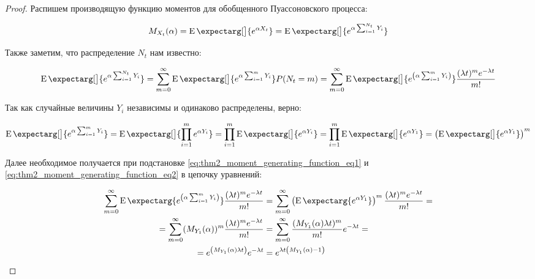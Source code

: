 \documentclass[a4paper,12pt]{article}
\theoremstyle{definition}
\newcommand{\expect}{\operatorname{E}\expectarg}
\begin{document}
\begin{proof}

Распишем производящую функцию моментов для обобщенного Пуассоновского процесса:

\begin{equation*}
     M_{X_t}(\alpha) = \expect[\big]{e^{\alpha X_t}} = \expect[\big]{e^{\alpha \sum_{i=1}^{N_t} Y_i}}
\end{equation*}

Также заметим, что распределение $N_t$ нам известно:

\begin{equation}\label{eq:thm2_moment_generating_function_eq1}
     \expect[\big]{e^{\alpha \sum_{i=1}^{N_t} Y_i}} = \sum_{m=0}^{\infty} \expect[\big]{e^{\alpha \sum_{i=1}^{m} Y_i}} P(N_t = m) = \sum_{m=0}^{\infty} \expect[\big]{e^{\left(\alpha \sum_{i=1}^{m} Y_i\right)}} \frac{(\lambda t)^{m} e^{-\lambda t}}{m!}
\end{equation}

Так как случайные величины $Y_i$ независимы и одинаково распределены, верно:

\begin{equation}\label{eq:thm2_moment_generating_function_eq2}
     \expect[\big]{e^{\alpha \sum_{i=1}^{m} Y_i}} = \expect[\big]{\prod_{i=1}^{m} e^{\alpha Y_i}} = \prod_{i=1}^{m}  \expect[\big]{e^{\alpha Y_i}} = \prod_{i=1}^{m}  \expect[\big]{e^{\alpha Y_1}} = \left( \expect[\big]{e^{\alpha Y_1}} \right)^{m}
\end{equation}

Далее необходимое получается при подстановке \eqref{eq:thm2_moment_generating_function_eq1} и \eqref{eq:thm2_moment_generating_function_eq2} в цепочку уравнений:

\begin{equation*}
\begin{split}
    \sum_{m=0}^{\infty} \expect{e^{\left(\alpha \sum_{i=1}^{m} Y_i\right)}} \frac{(\lambda t)^{m} e^{-\lambda t}}{m!} &= \sum_{m=0}^{\infty} \left(\expect{e^{\alpha Y_1}}\right)^{m} \frac{(\lambda t)^{m} e^{-\lambda t}}{m!} =\\
    = \sum_{m=0}^{\infty} (M_{Y_1} (\alpha))^{m} \frac{(\lambda t)^{m} e^{-\lambda t}}{m!} &= \sum_{m=0}^{\infty} \frac{(M_{Y_1} (\alpha) \lambda t)^{m}}{m!} e^{-\lambda t} =\\
    = e^{\left(M_{Y_1} (\alpha) \lambda t\right)} e^{-\lambda t} &= e^{\lambda t \left(M_{Y_1}(\alpha) - 1\right)}
\end{split}
\end{equation*}

\end{proof}
\end{document}

